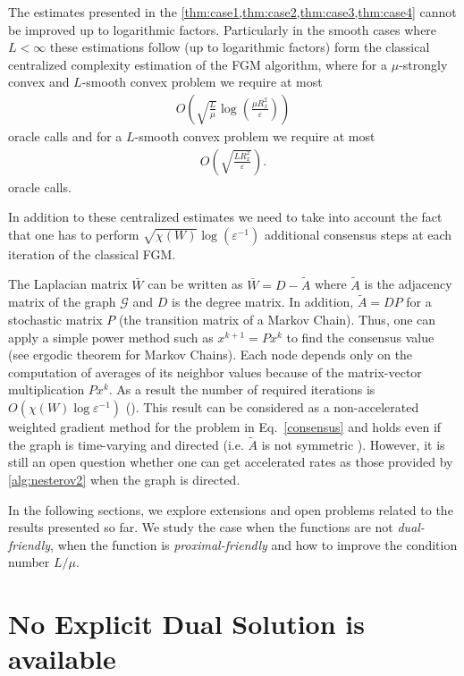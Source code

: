 \documentclass[final]{siamart1116}
\numberwithin{theorem}{section}
\begin{document}
	The estimates presented in the \cref{thm:case1,thm:case2,thm:case3,thm:case4} cannot be improved up to logarithmic factors. Particularly in the smooth cases where $L < \infty$ these estimations follow (up to logarithmic factors) form the classical centralized complexity estimation of the FGM algorithm, where for a $\mu$-strongly convex and $L$-smooth convex problem we require at most
	\begin{align*}
	O\left(  \sqrt{\frac{L}{\mu} }\log \left( \frac{\mu R_x^2}{\varepsilon}\right) \right) 
	\end{align*}
	oracle calls and for a $L$-smooth convex problem we require at most
	\begin{align*}
	O\left( \sqrt{\frac{LR_x^2}{\varepsilon}}\right) .
	\end{align*}
	oracle calls.
	
	In addition to these centralized estimates we need to take into account the fact that one has to perform $\sqrt{\chi(W)} \log (\varepsilon^{-1})$ additional consensus steps at each iteration of the classical FGM. 
	
	The Laplacian matrix $\bar W$ can be written as $\bar W  = D - \tilde{A}$	where $\tilde{A}$ is the adjacency matrix of the graph $\mathcal{G}$ and $D$ is the degree matrix. In addition, $\tilde{A} = D P$ for a stochastic matrix $P$ (the transition matrix of a Markov Chain). Thus, one can apply a simple power method such as $x^{k+1} = Px^k$ to find the consensus value (see ergodic theorem for Markov Chains). Each node depends only on the computation of averages of its neighbor values because of the matrix-vector multiplication $Px^k$. As a result the number of required iterations is $O(\chi(W)\log \varepsilon^{-1})$ (\cite{ned09,tsi84,ber89}). This result can be considered as a non-accelerated weighted gradient method for the problem in Eq.~\eqref{consensus} and holds even if the graph is time-varying and directed (i.e. $\tilde{A}$ is not symmetric \cite{ned13,ned15b,ned16}). However, it is still an open question whether one can get accelerated rates as those provided by \cref{alg:nesterov2} when the graph is directed. 
	
	In the following sections, we explore extensions and open problems related to the results presented so far. We study the case when the functions are not \textit{dual-friendly}, when the function is \textit{proximal-friendly} and how to improve the condition number $L /\mu$.
		
	\section{No Explicit Dual Solution is available}\label{sec:no_dual}
	
\end{document}
